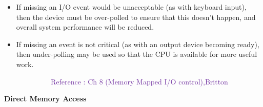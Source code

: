 \documentclass[12pt]{article}
\begin{document}
\begin{itemize}
	\item {\fontsize{13pt}{15.6pt}\selectfont If missing an I/O event would be unacceptable (as with keyboard input), then the device must be over-polled to ensure that this doesn't happen, and overall system performance will be reduced.\par}\par

	\item {\fontsize{13pt}{15.6pt}\selectfont If missing an event is not critical (as with an output device becoming ready), then under-polling may be used so that the CPU is available for more useful work.\par}
\end{itemize}\par

\setlength{\parskip}{8.04pt}
\ \ \ \ \ \ \ \ \ \ \ \ \  \textcolor[HTML]{7030A0}{Reference : Ch 8 (Memory Mapped I/O control),Britton}\par

\begin{adjustwidth}{0.5in}{0.0in}
{\fontsize{20pt}{24.0pt}\selectfont \textbf{Direct Memory Access}\par}\par

\end{adjustwidth}
\end{document}
